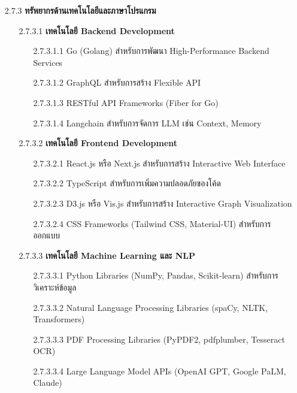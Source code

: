 \documentclass[12pt,a4paper]{article}
\begin{document}
\begin{enumerate}[leftmargin=2cm]
{\begin{enumerate}
            \item[2.7.3] \textbf{ทรัพยากรด้านเทคโนโลยีและภาษาโปรแกรม}
            \begin{enumerate}
                \item[2.7.3.1] \textbf{เทคโนโลยี Backend Development}
                \begin{enumerate}
                    \item[2.7.3.1.1] Go (Golang) สำหรับการพัฒนา High-Performance Backend Services
                    \item[2.7.3.1.2] GraphQL สำหรับการสร้าง Flexible API
                    \item[2.7.3.1.3] RESTful API Frameworks (Fiber for Go)
                    \item[2.7.3.1.4] Langchain สำหรับการจัดการ LLM เช่น Context, Memory
                \end{enumerate}
                
                \item[2.7.3.2] \textbf{เทคโนโลยี Frontend Development}
                \begin{enumerate}
                    \item[2.7.3.2.1] React.js หรือ Next.js สำหรับการสร้าง Interactive Web Interface
                    \item[2.7.3.2.2] TypeScript สำหรับการเพิ่มความปลอดภัยของโค้ด
                    \item[2.7.3.2.3] D3.js หรือ Vis.js สำหรับการสร้าง Interactive Graph Visualization
                    \item[2.7.3.2.4] CSS Frameworks (Tailwind CSS, Material-UI) สำหรับการออกแบบ
                \end{enumerate}
                
                \item[2.7.3.3] \textbf{เทคโนโลยี Machine Learning และ NLP}
                \begin{enumerate}
                    \item[2.7.3.3.1] Python Libraries (NumPy, Pandas, Scikit-learn) สำหรับการวิเคราะห์ข้อมูล
                    \item[2.7.3.3.2] Natural Language Processing Libraries (spaCy, NLTK, Transformers)
                    \item[2.7.3.3.3] PDF Processing Libraries (PyPDF2, pdfplumber, Tesseract OCR)
                    \item[2.7.3.3.4] Large Language Model APIs (OpenAI GPT, Google PaLM, Claude)
                \end{enumerate}
                

\end{enumerate}
\end{enumerate}}
\end{enumerate}
\end{document}
